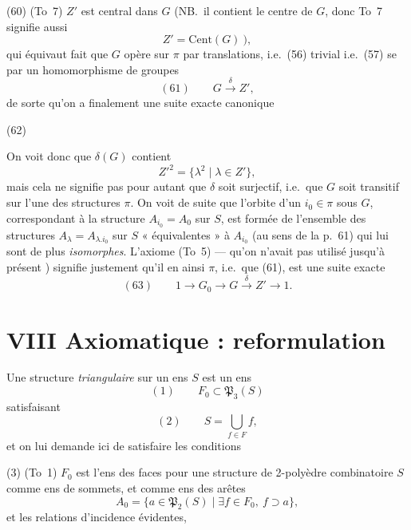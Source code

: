 \documentclass[11pt,a4paper]{article}
\begin{document}
(60) (To~7) $Z'$ \struck{\ill{}} est central dans $G$ (NB.\ il contient \struck{\ill{}}
le centre de $G$, donc To~7
signifie aussi
\[
Z'=\mathrm{Cent}(G)\ ),
\]
qui équivaut  fait que $G$ opère
sur $\pi$ par translations, i.e.\ (56) trivial i.e.\ (57)
se  par un homomorphisme de groupes
\[
(61)\qquad G \xrightarrow{\ \delta\ } Z',
\]
de sorte qu'on a finalement une suite
exacte canonique

(62)



On voit donc que $\delta(G)$ contient 
\[
Z'^{2}=\{\lambda^2 \mid \lambda\in Z'\},
\]
mais cela ne signifie pas pour autant que
$\delta$ soit surjectif, i.e.\ que $G$ soit transitif
sur l'une des structures $\pi$. On voit de
suite que l'orbite d'un $i_0\in\pi$ sous $G$,
correspondant à la structure $A_{i_0}=A_0$ sur $S$,
est formée de l'ensemble des structures
$A_\lambda=A_{\lambda.i_0}$ sur $S$ « équivalentes » à $A_{i_0}$
(au sens de la p.~61) qui lui sont de
plus \emph{isomorphes}. L'axiome (To~5) — qu'on
n'avait pas utilisé jusqu'à présent )
signifie justement qu'il en  ainsi
 \struck{\ill{}} $\pi$, i.e.\ que (61), est une
suite exacte 
\[
(63)\qquad 1\longrightarrow G_0\longrightarrow G \xrightarrow{\ \delta\ } Z' \longrightarrow 1 .
\]

\section{VIII Axiomatique : reformulation}

Une structure \emph{triangulaire} sur un ens $S$ est
un ens
\[
(1)\qquad F_0 \subset \mathfrak{P}_3(S)
\]
 satisfaisant
\[
(2)\qquad S=\bigcup_{f\in F} f ,
\]
et on lui demande ici de satisfaire les
conditions

(3) (To~1) $F_0$ est l'ens des faces pour une 
structure de 2-polyèdre \struck{\ill{}} combinatoire
 $S$ comme ens de sommets,
et comme ens des arêtes
\[
A_0=\{a\in\mathfrak{P}_2(S)\mid \exists f\in F_0,\ f\supset a\},
\]
et les relations d'incidence évidentes,
\end{document}
